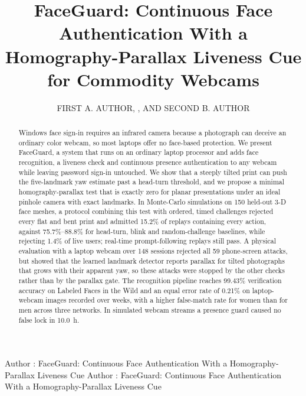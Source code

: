 \documentclass{ieeeaccess}
\begin{document}

\title{FaceGuard: Continuous Face Authentication With a Homography-Parallax Liveness Cue for Commodity Webcams}
\author{\uppercase{First A. Author}, ,
AND \uppercase{Second B. Author}}

\address[1]{Department of Computer Science and Engineering, Institution Name, City, Country (e-mail: author@example.edu)}

\markboth
{Author \headeretal: FaceGuard: Continuous Face Authentication With a Homography-Parallax Liveness Cue}
{Author \headeretal: FaceGuard: Continuous Face Authentication With a Homography-Parallax Liveness Cue}


\begin{abstract}
Windows face sign-in requires an infrared camera because a photograph can deceive an ordinary color webcam, so most laptops offer no face-based protection. We present FaceGuard, a system that runs on an ordinary laptop processor and adds face recognition, a liveness check and continuous presence authentication to any webcam while leaving password sign-in untouched. We show that a steeply tilted print can push the five-landmark yaw estimate past a head-turn threshold, and we propose a minimal homography-parallax test that is exactly zero for planar presentations under an ideal pinhole camera with exact landmarks. In Monte-Carlo simulations on 150 held-out 3-D face meshes, a protocol combining this test with ordered, timed challenges rejected every flat and bent print and admitted 15.2\% of replays containing every action, against 75.7\%--88.8\% for head-turn, blink and random-challenge baselines, while rejecting 1.4\% of live users; real-time prompt-following replays still pass. A physical evaluation with a laptop webcam over 148 sessions rejected all 59 phone-screen attacks, but showed that the learned landmark detector reports parallax for tilted photographs that grows with their apparent yaw, so these attacks were stopped by the other checks rather than by the parallax gate. The recognition pipeline reaches 99.43\% verification accuracy on Labeled Faces in the Wild and an equal error rate of 0.21\% on laptop-webcam images recorded over weeks, with a higher false-match rate for women than for men across three networks. In simulated webcam streams a presence guard caused no false lock in 10.0~h.
\end{abstract}
\end{document}

